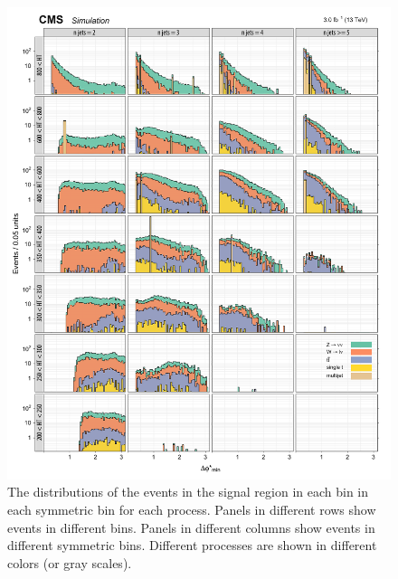 \begin{figure}[!h]
\centering
\includegraphics[scale=0.95]{figures/kiplots/c150107_s150318_f015_biasedDPhi_100}
\caption{The \bdphi distributions of the events in the signal region
in each \scalht bin in each symmetric \njet bin for each process.
Panels in different rows show events in different \scalht bins. Panels
in different columns show events in different symmetric \njet bins.
Different processes are shown in different colors (or gray scales).}
\label{c150107_s150318_f015_biasedDPhi_100}
\end{figure}

